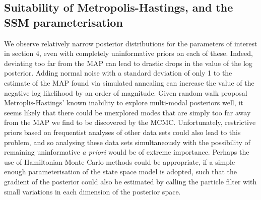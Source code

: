 \documentclass[a4paper,12pt]{article}
\begin{document}
\subsection{Suitability of Metropolis-Hastings, and the SSM parameterisation}
We observe relatively narrow posterior distributions for the parameters of interest in section 4, even with completely uninformative priors on each of these. Indeed, deviating too far from the MAP can lead to drastic drops in the value of the log posterior. Adding normal noise with a standard deviation of only 1 to the estimate of the MAP found via simulated annealing can increase the value of the negative log likelihood by an order of magnitude. Given random walk proposal Metroplis-Hastings' known inability to explore multi-modal posteriors well, it seems likely that there could be unexplored modes that are simply too far away from the MAP we find to be discovered by the MCMC. Unfortunately, restrictive priors based on frequentist analyses of other data sets could also lead to this problem, and so analysing these data sets simultaneously with the possibility of remaining uninformative \textit{a priori} would be of extreme importance. Perhaps the use of Hamiltonian Monte Carlo methods could be appropriate, if a simple enough parameterisation of the state space model is adopted, such that the gradient of the posterior could also be estimated by calling the particle filter with small variations in each dimension of the posterior space.
\end{document}
